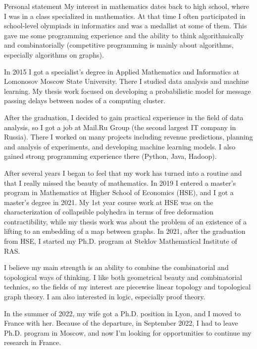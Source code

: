 \documentclass{resume}
\begin{document}
\begin{rSection}{Personal statement}
  My interest in mathematics dates back to high school, where I was in a class specialized in
  mathematics. At that time I often participated in school-level olympiads in informatics and was a
  medallist at some of them. This gave me some programming experience and the ability to think
  algorithmically and combinatorially (competitive programming is mainly about algorithms,
  especially algorithms on graphs).

  In 2015 I got a specialist's degree in Applied Mathematics and Informatics at Lomonosov Moscow
  State University. There I studied data analysis and machine learning. My thesis work focused on
  developing a probabilistic model for message passing delays between nodes of a computing cluster.

  After the graduation, I decided to gain practical experience in the field of data analysis, so I
  got a job at Mail.Ru Group (the second largest IT company in Russia). There I worked on many
  projects including revenue predictions, planning and analysis of experiments, and developing machine
  learning models. I also gained strong programming experience there (Python, Java, Hadoop).

  After several years I began to feel that my work has turned into a routine and that I really
  missed the beauty of mathematics. In 2019 I entered a master's program in Mathematics at Higher
  School of Economics (HSE), and I got a master's degree in 2021. My 1st year course work at HSE was
  on the characterization of collapsible polyhedra in terms of free deformation contractibility,
  while my thesis work was about the problem of an existence of a lifting to an embedding of a map
  between graphs.  In 2021, after the graduation from HSE, I started my Ph.D. program at Steklov
  Mathematical Institute of RAS.

  I believe my main strength is an ability to combine the combinatorial and topological ways of
  thinking. I like both geometrical beauty and combinatorial technics, so the fields of my interest
  are piecewise linear topology and topological graph theory. I am also interested in logic,
  especially proof theory.

  In the summer of 2022, my wife got a Ph.D. position in Lyon, and I moved to France with
  her. Because of the departure, in September 2022, I had to leave Ph.D. program in Moscow, and now
  I'm looking for opportunities to continue my research in France.
\end{rSection}
\end{document}
